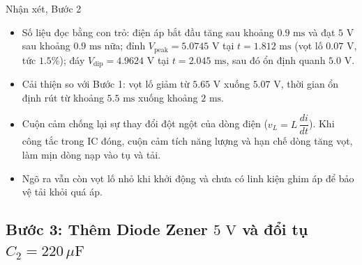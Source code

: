 \simresult
{}

\begin{notebox}{Nhận xét, Bước 2}
  \begin{itemize}[leftmargin=1.5em,itemsep=2pt,topsep=2pt]
    \item Số liệu đọc bằng con trỏ: điện áp bắt đầu tăng sau khoảng $0.9\text{ ms}$ và đạt $5\text{ V}$ sau khoảng $0.9\text{ ms}$ nữa; đỉnh $V_{\text{peak}} = 5.0745\text{ V}$ tại $t = 1.812\text{ ms}$ (vọt lố $0.07\text{ V}$, tức $1.5\%$); đáy $V_{\text{dip}} = 4.9624\text{ V}$ tại $t = 2.045\text{ ms}$, sau đó ổn định quanh $5.0\text{ V}$.
    \item Cải thiện so với Bước 1: vọt lố giảm từ $5.65\text{ V}$ xuống $5.07\text{ V}$, thời gian ổn định rút từ khoảng $5.5\text{ ms}$ xuống khoảng $2\text{ ms}$.
    \item Cuộn cảm chống lại sự thay đổi đột ngột của dòng điện ($v_L = L\,\dfrac{di}{dt}$). Khi công tắc trong IC đóng, cuộn cảm tích năng lượng và hạn chế dòng tăng vọt, làm mịn dòng nạp vào tụ và tải.
    \item Ngõ ra vẫn còn vọt lố nhỏ khi khởi động và chưa có linh kiện ghim áp để bảo vệ tải khỏi quá áp.
  \end{itemize}
\end{notebox}

\Needspace{0.4\textheight}
\subsection{Bước 3: Thêm Diode Zener \texorpdfstring{$5\text{ V}$}{5V} và đổi tụ \texorpdfstring{$C_2 = 220\,\mu\text{F}$}{C2 = 220uF}}

\simresult
{}

